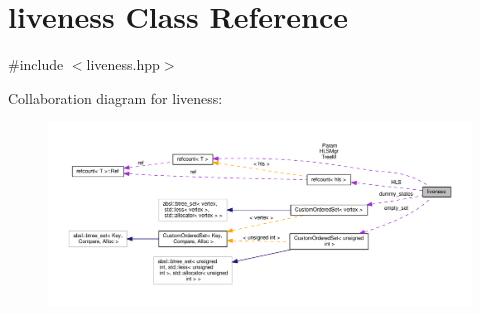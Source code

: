 \hypertarget{classliveness}{}\section{liveness Class Reference}
\label{classliveness}


{\ttfamily \#include $<$liveness.\+hpp$>$}



Collaboration diagram for liveness\+:
\nopagebreak
\begin{figure}[H]
\begin{center}
\leavevmode
\includegraphics[width=350pt]{d4/d3f/classliveness__coll__graph}
\end{center}
\end{figure}
